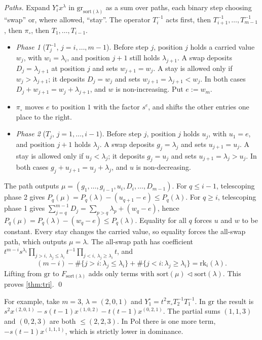 \documentclass[11pt]{amsart}
\theoremstyle{definition}
\theoremstyle{remark}
\numberwithin{equation}{section}
\begin{document}
\emph{Paths.} Expand $Y^\circ_ix^\lambda$ in $\mathrm{gr}_{\mathrm{sort}(\lambda)}$ as a sum over paths, each binary step choosing ``swap'' or, where allowed, ``stay''. The operator $T_i^{-1}$ acts first, then $T_{i+1}^{-1},\dots,T_{m-1}^{-1}$, then $\pi_\circ$, then $T_1,\dots,T_{i-1}$.
\begin{itemize}
\item \emph{Phase 1} ($T_j^{-1}$, $j=i,\dots,m-1$). Before step $j$, position $j$ holds a carried value $w_j$, with $w_i=\lambda_i$, and position $j+1$ still holds $\lambda_{j+1}$. A swap deposits $D_j=\lambda_{j+1}$ at position $j$ and sets $w_{j+1}=w_j$. A stay is allowed only if $w_j>\lambda_{j+1}$; it deposits $D_j=w_j$ and sets $w_{j+1}=\lambda_{j+1}<w_j$. In both cases $D_j+w_{j+1}=w_j+\lambda_{j+1}$, and $w$ is non-increasing. Put $e:=w_m$.
\item \emph{$\pi_\circ$} moves $e$ to position $1$ with the factor $s^e$, and shifts the other entries one place to the right.
\item \emph{Phase 2} ($T_j$, $j=1,\dots,i-1$). Before step $j$, position $j$ holds $u_j$, with $u_1=e$, and position $j+1$ holds $\lambda_j$. A swap deposits $g_j=\lambda_j$ and sets $u_{j+1}=u_j$. A stay is allowed only if $u_j<\lambda_j$; it deposits $g_j=u_j$ and sets $u_{j+1}=\lambda_j>u_j$. In both cases $g_j+u_{j+1}=u_j+\lambda_j$, and $u$ is non-decreasing.
\end{itemize}
The path outputs $\mu=(g_1,\dots,g_{i-1},u_i,D_i,\dots,D_{m-1})$. For $q\le i-1$, telescoping phase 2 gives $P_q(\mu)=P_q(\lambda)-(u_{q+1}-e)\le P_q(\lambda)$. For $q\ge i$, telescoping phase 1 gives $\sum_{j=q}^{m-1}D_j=\sum_{p>q}\lambda_p+(w_q-e)$, hence $P_q(\mu)=P_q(\lambda)-(w_q-e)\le P_q(\lambda)$. Equality for all $q$ forces $u$ and $w$ to be constant. Every stay changes the carried value, so equality forces the all-swap path, which outputs $\mu=\lambda$. The all-swap path has coefficient $t^{m-i}s^{\lambda_i}\prod_{j>i,\ \lambda_j\le\lambda_i}t^{-1}\prod_{j<i,\ \lambda_j\ge\lambda_i}t$, and
\[ (m-i)-\#\{j>i:\lambda_j\le\lambda_i\}+\#\{j<i:\lambda_j\ge\lambda_i\}=\mathrm{rk}_i(\lambda). \]
Lifting from $\mathrm{gr}$ to $F_{\mathrm{sort}(\lambda)}$ adds only terms with $\mathrm{sort}(\mu)\vartriangleleft\mathrm{sort}(\lambda)$. This proves \cref{thm:tri}. \qed

For example, take $m=3$, $\lambda=(2,0,1)$ and $Y^\circ_1=t^2\pi_\circ T_2^{-1}T_1^{-1}$. In $\mathrm{gr}$ the result is $s^2x^{(2,0,1)}-s(t-1)x^{(1,0,2)}-t(t-1)x^{(0,2,1)}$. The partial sums $(1,1,3)$ and $(0,2,3)$ are both $\le(2,2,3)$. In $\mathrm{Pol}$ there is one more term, $-s(t-1)x^{(1,1,1)}$, which is strictly lower in dominance.
\end{document}
